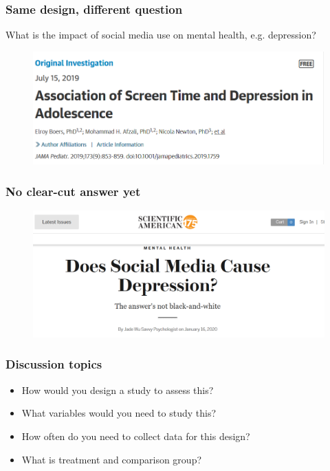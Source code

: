 \documentclass[10pt,english,dvipsnames,aspectratio=169,handout]{beamer}\usepackage[]{graphicx}\usepackage[]{xcolor}
\begin{document}
\begin{frame}
  \frametitle{Same design, different question}
  
  What is the impact of social media use on mental health, e.g. depression?
  
\begin{figure}
\begin{center}
    \includegraphics[scale=0.5]{../04-figures/09/06.PNG}
\end{center}
\label{fig:02}
\end{figure}
  
\end{frame}


\begin{frame}
  \frametitle{No clear-cut answer yet}
  
  \begin{figure}
\begin{center}
    \includegraphics[scale=0.4]{../04-figures/09/07.PNG}
\end{center}
\label{fig:03}
\end{figure}
  
\end{frame}


\begin{frame}
  \frametitle{Discussion topics}
  
  \begin{itemize}
  \setlength\itemsep{1.5em}
    \item How would you design a study to assess this?
    \item What variables would you need to study this?
    \item How often do you need to collect data for this design?
    \item What is treatment and comparison group?
  \end{itemize}
  
\end{frame}
\end{document}
